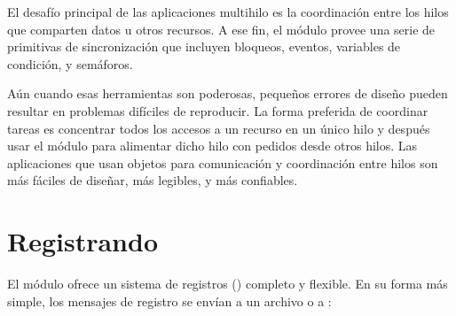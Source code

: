 \documentclass[a5paper,10pt,spanish]{sphinxmanual}
\begin{document}
\sphinxAtStartPar
El desafío principal de las aplicaciones multi\sphinxhyphen{}hilo es la coordinación entre los hilos que comparten datos u otros recursos.  A ese fin, el módulo  provee una serie de primitivas de sincronización que incluyen bloqueos, eventos, variables de condición, y semáforos.

\sphinxAtStartPar
Aún cuando esas herramientas son poderosas, pequeños errores de diseño pueden resultar en problemas difíciles de reproducir.  La forma preferida de coordinar tareas es concentrar todos los accesos a un recurso en un único hilo y después usar el módulo  para alimentar dicho hilo con pedidos desde otros hilos.  Las aplicaciones que usan objetos  para comunicación y coordinación entre hilos son más fáciles de diseñar, más legibles, y más confiables.


\section{Registrando}
\label{\detokenize{tutorial/stdlib2:logging}}\label{\detokenize{tutorial/stdlib2:tut-logging}}
\sphinxAtStartPar
El módulo  ofrece un sistema de registros () completo y flexible.  En su forma más simple, los mensajes de registro se envían a un archivo o a :

\begin{sphinxVerbatim}[commandchars=\\\{\}]
 
 
\end{sphinxVerbatim}
\end{document}
